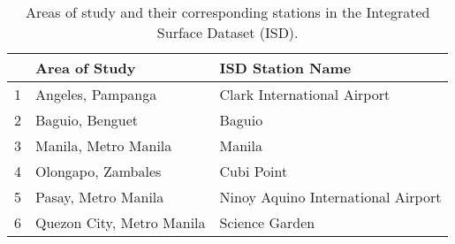 	\begin{table}	
		\caption{Areas of study and their corresponding stations in the Integrated Surface Dataset (ISD).}
		\label{tab:isd-stations}
		\centering
		\begin{tabular}{lll}
			\hline \hline
			& Area of Study             & ISD Station Name                       \\
			\hline
			1 & Angeles, Pampanga         & Clark International Airport        \\
			2 & Baguio, Benguet           & Baguio                             \\
			3 & Manila, Metro Manila      & Manila                             \\
			4 & Olongapo, Zambales        & Cubi Point                         \\
			5 & Pasay, Metro Manila      & Ninoy Aquino International Airport \\
			6 & Quezon City, Metro Manila & Science Garden \\                   
			\hline
		\end{tabular}	
	\end{table}

